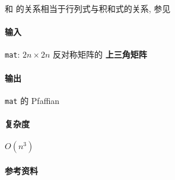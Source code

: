 和  的关系相当于行列式与积和式的关系, 参见 

\paragraph{输入}

\verb|mat|: \(2n\times 2n\) 反对称矩阵的 \textbf{上三角矩阵}

\paragraph{输出}

\verb|mat| 的 Pfaffian

\paragraph{复杂度} \(O\left(n^3\right)\)

\paragraph{参考资料} \cite{enwiki:1229899175} \cite{enwiki:1216412359}